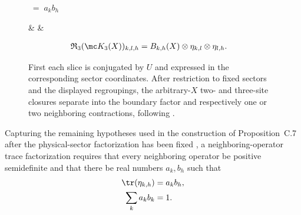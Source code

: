 \begin{figure}[ht]
\begin{minipage}{0.41\textwidth}
\begin{center}
\begin{tenkz}[rows={wire}, cols=2, west=none, east=none]
            \end{tenkz}
            $\;=\;a_kb_h\;$
            \begin{tenkz}[rows={wire}, cols=3, west=none, east=none]
                 &
                 &
            \end{tenkz}
        \end{center}
    \end{minipage}\hfill
    \begin{minipage}{0.56\textwidth}
        \centering
        \begin{align}
            \mathfrak R_3(\mc K_3(X))_{k,l,h}
             & =B_{k,h}(X)\otimes\eta_{k,l}\otimes\eta_{l,h}.
            \notag
        \end{align}
    \end{minipage}
    \caption{First each slice is conjugated by $U$ and expressed in the
        corresponding sector coordinates. After restriction to fixed sectors and
        the displayed regroupings, the arbitrary-$X$ two- and three-site closures
        separate into the boundary factor and respectively one or two neighboring
        contractions, following
        \cite[lines~638--655 and Appendix~C.2, lines~1435--1448]
        {Cirac2016MPDO_arXiv}.}
    \label{fig:mpdo_sector_closure_factorizations}
\end{figure}

\begin{definition}
    \label{def:mpdo_neighboring_trace_factorization}
    \leanok
    Capturing the remaining hypotheses used in the construction of
    Proposition~C.7 after the physical-sector factorization has been fixed
    \cite[Appendix~C.2, lines~1389--1403]{Cirac2016MPDO_arXiv}, a
    neighboring-operator trace factorization requires that every neighboring
    operator be positive semidefinite and that there be real numbers $a_k,b_h$
    such that
    \begin{align}
        \tr(\eta_{k,h}) & =a_kb_h,
        \notag                     \\
        \sum_k a_kb_k   & =1.
        \notag
    \end{align}
\end{definition}

